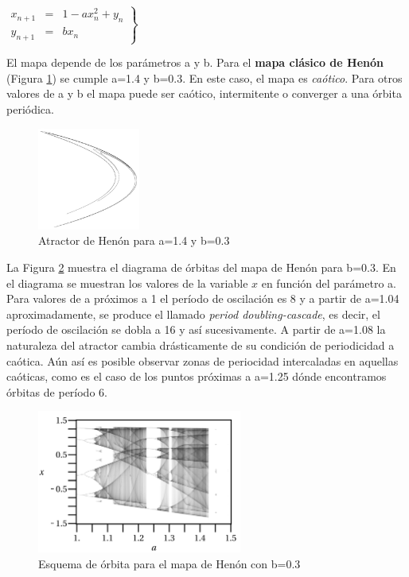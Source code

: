$\left.
\begin{array}{rcl}
x_{n+1} & = & 1-ax^2_n+y_n\\
y_{n+1}& =& bx_n
\end{array}\right\}$\newline


El mapa depende de los parámetros a y b. Para el \textbf{mapa clásico de Henón} (Figura \ref{fig:henon_clas}) se cumple a=1.4 y b=0.3. En este caso, el mapa es \emph{caótico}. Para otros valores de a y b el mapa puede ser caótico, intermitente o converger a una órbita periódica.

\begin{figure}[hbtp]
\centering
\includegraphics[width = 0.3\textwidth]{img/henon_clas.png}
\caption{Atractor de Henón para a=1.4 y b=0.3}
\label{fig:henon_clas}
\end{figure}

La Figura \ref{fig:henon_orb} muestra el diagrama de órbitas del mapa de Henón para b=0.3. En el diagrama se muestran los valores de la variable $x$ en función del parámetro a. Para valores de a próximos a 1 el período de oscilación es 8 y a partir de a=1.04 aproximadamente, se produce el llamado \emph{period doubling-cascade}, es decir,  el período de oscilación se dobla a 16 y así sucesivamente. A partir de a=1.08 la naturaleza del atractor cambia drásticamente de su condición de periodicidad a caótica. Aún así es posible observar zonas de periocidad intercaladas en aquellas caóticas, como es el caso de los puntos próximas a a=1.25 dónde encontramos órbitas de período 6.

\begin{figure}[hbtp]
\centering
\includegraphics[width = 0.6\textwidth]{img/henon_orb.png}
\caption{Esquema de órbita para el mapa de Henón con b=0.3}
\label{fig:henon_orb}
\end{figure}

